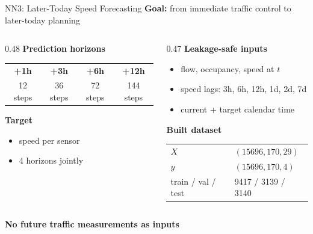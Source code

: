 \documentclass[aspectratio=169]{beamer}
\begin{document}
\begin{frame}{NN3: Later-Today Speed Forecasting}
\footnotesize
\textbf{Goal:} from immediate traffic control to later-today planning

\vspace{0.5em}
\begin{columns}[T,totalwidth=\textwidth]
\begin{column}{0.48\textwidth}
\textbf{Prediction horizons}

\vspace{0.3em}
\begin{center}
\renewcommand{\arraystretch}{1.25}
\begin{tabular}{@{}cccc@{}}
\toprule
\textbf{+1h} & \textbf{+3h} & \textbf{+6h} & \textbf{+12h} \\
12 steps & 36 steps & 72 steps & 144 steps \\
\bottomrule
\end{tabular}
\end{center}

\vspace{0.5em}
\textbf{Target}

\begin{itemize}
  \item speed per sensor
  \item 4 horizons jointly
\end{itemize}
\end{column}
\begin{column}{0.47\textwidth}
\textbf{Leakage-safe inputs}
\begin{itemize}
  \item flow, occupancy, speed at $t$
  \item speed lags: 3h, 6h, 12h, 1d, 2d, 7d
  \item current + target calendar time
\end{itemize}

\vspace{0.4em}
\textbf{Built dataset}
\begin{tabular}{@{}ll@{}}
$X$ & $(15696, 170, 29)$ \\
$y$ & $(15696, 170, 4)$ \\
train / val / test & 9417 / 3139 / 3140 \\
\end{tabular}
\end{column}
\end{columns}

\vspace{0.35em}
\centering
\textbf{No future traffic measurements as inputs}
\end{frame}
\end{document}
